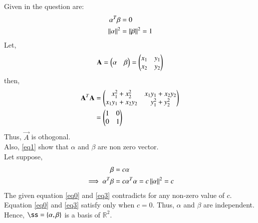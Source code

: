 \documentclass[journal,12pt,twocolumn]{IEEEtran}
\begin{document}
Given in the question are:
\begin{align}
\alpha^T\beta&=0\label{eq0}\\
\left\lVert\alpha\right\rVert^2 &=\left\lVert\beta\right\rVert^2=1 \label{eq1}
\end{align}
Let,
\begin{align}
 \mathbf{A}=\begin{pmatrix}\alpha & \beta\end{pmatrix}=\begin{pmatrix}x_1&y_1\\x_2&y_2\end{pmatrix}
\end{align}
then,
\begin{align}
 \mathbf{A}^T\mathbf{A}&=\begin{pmatrix}x_1^2+x_2^2 &x_1y_1+x_2y_2\\x_1y_1+x_2y_2&y_1^2+y_2^2\end{pmatrix}\\ &=\begin{pmatrix}1&0\\0&1\end{pmatrix}
\end{align}
Thus, $\vec{A}$ is othogonal.\\
Also, \ref{eq1} show that $\alpha$ and $\beta$ are non zero vector.\\
Let suppose,
\begin{align}
\beta&=c\alpha\label{eq2}\\
\implies \alpha^T\beta&=c\alpha^T\alpha=c\left\lVert\alpha\right\rVert^2=c\label{eq3}
\end{align}
The given equation \ref{eq0} and \ref{eq3} contradicts for any non-zero value of $c$. Equation \ref{eq0} and \ref{eq3} satisfy only when $c=0$.
Thus, $\alpha$ and $\beta$ are independent. \\
Hence, $\ss=\{\vec{\alpha},\vec{\beta}\}$ is a basis of $\mathbb{R}^2$.\\
\end{document}
